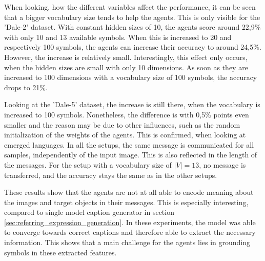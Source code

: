 When looking, how the different variables affect the performance, it can be seen that a bigger vocabulary size tends to help the agents.
This is only visible for the 'Dale-2' dataset.
With constant hidden sizes of 10, the agents score around 22,9\% with only 10 and 13 available symbols.
When this is increased to 20 and respectively 100 symbols, the agents can increase their accuracy to around 24,5\%.
However, the increase is relatively small.
Interestingly, this effect only occurs, when the hidden sizes are small with only 10 dimensions.
As soon as they are increased to 100 dimensions with a vocabulary size of 100 symbols, the accuracy drops to 21\%.

Looking at the 'Dale-5' dataset, the increase is still there, when the vocabulary is increased to 100 symbols.
Nonetheless, the difference is with 0,5\% points even smaller and the reason may be due to other influences, such as the random initialization of the weights of the agents.
This is confirmed, when looking at emerged languages.
In all the setups, the same message is communicated for all samples, independently of the input image.
This is also reflected in the length of the messages.
For the setup with a vocabulary size of $|V| = 13$, no message is transferred, and the accuracy stays the same as in the other setups.

These results show that the agents are not at all able to encode meaning about the images and target objects in their messages.
This is especially interesting, compared to single model caption generator in section \ref{sec:referring_expression_generation}.
In these experiments, the model was able to converge towards correct captions and therefore able to extract the necessary information.
This shows that a main challenge for the agents lies in grounding symbols in these extracted features.

